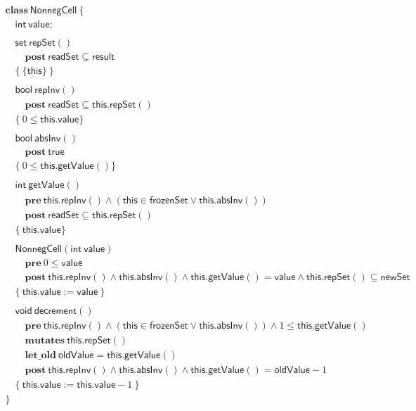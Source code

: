 \documentclass{article}
\begin{document}
$$\begin{array}{l}
\mathbf{class}\ \mathsf{NonnegCell}\ \{\\
\quad \mathsf{int}\ \mathsf{value};\\
\\
\quad \mathsf{set}\ \mathsf{repSet}()\\
\quad\quad \mathbf{post}\ \mathsf{readSet} \subseteq \mathsf{result}\\
\quad \{\ \{\mathsf{this}\}\ \}\\
\\
\quad \mathsf{bool}\ \mathsf{repInv}()\\
\quad\quad \mathbf{post}\ \mathsf{readSet} \subseteq \mathsf{this}.\mathsf{repSet}()\\
\quad \{\ 0 \le \mathsf{this}.\mathsf{value} \}\\
\\
\quad \mathsf{bool}\ \mathsf{absInv}()\\
\quad\quad \mathbf{post}\ \mathsf{true}\\
\quad \{\ 0 \le \mathsf{this}.\mathsf{getValue}() \}\\
\\
\quad \mathsf{int}\ \mathsf{getValue}()\\
\quad\quad \mathbf{pre}\ \mathsf{this}.\mathsf{repInv}() \land (\mathsf{this} \in \mathsf{frozenSet} \lor \mathsf{this}.\mathsf{absInv}())\\
\quad\quad \mathbf{post}\ \mathsf{readSet} \subseteq \mathsf{this}.\mathsf{repSet}()\\
\quad \{\ \mathsf{this}.\mathsf{value} \}\\
\\
\quad \mathsf{NonnegCell}(\mathsf{int}\ \mathsf{value})\\
\quad\quad \mathbf{pre}\ 0 \le \mathsf{value}\\
\quad\quad \mathbf{post}\ \mathsf{this}.\mathsf{repInv}() \land \mathsf{this}.\mathsf{absInv}() \land \mathsf{this}.\mathsf{getValue}() = \mathsf{value} \land \mathsf{this}.\mathsf{repSet}() \subseteq \mathsf{newSet}\\
\quad \{\ \mathsf{this}.\mathsf{value} := \mathsf{value}\ \}\\
\\
\quad \mathsf{void}\ \mathsf{decrement}()\\
\quad\quad \mathbf{pre}\ \mathsf{this}.\mathsf{repInv}() \land (\mathsf{this} \in \mathsf{frozenSet} \lor \mathsf{this}.\mathsf{absInv}()) \land 1 \le \mathsf{this}.\mathsf{getValue}()\\
\quad\quad \mathbf{mutates}\ \mathsf{this}.\mathsf{repSet}()\\
\quad\quad \mathbf{let\_old}\ \mathsf{oldValue} = \mathsf{this}.\mathsf{getValue}()\\
\quad\quad \mathbf{post}\ \mathsf{this}.\mathsf{repInv}() \land \mathsf{this}.\mathsf{absInv}() \land \mathsf{this}.\mathsf{getValue}() = \mathsf{oldValue} - 1\\
\quad \{\ \mathsf{this}.\mathsf{value} := \mathsf{this}.\mathsf{value} - 1\ \}\\
\}
\end{array}$$
\end{document}
